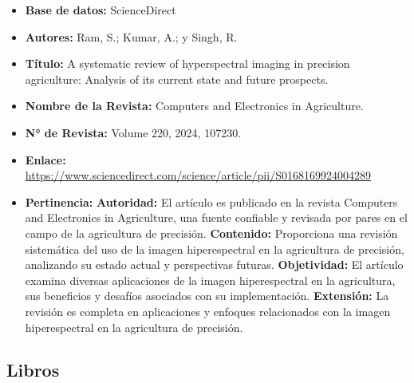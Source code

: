 \begin{itemize}
  \item \textbf{Base de datos:} ScienceDirect
  \item \textbf{Autores:} Ram, S.; Kumar, A.; y Singh, R.
  \item \textbf{Título:} A systematic review of hyperspectral imaging in precision agriculture: Analysis of its current state and future prospects.
  \item \textbf{Nombre de la Revista:} Computers and Electronics in Agriculture.
  \item \textbf{N° de Revista:} Volume 220, 2024, 107230.
  \item \textbf{Enlace:} \url{https://www.sciencedirect.com/science/article/pii/S0168169924004289}
  \item \textbf{Pertinencia:}
  \subitem \textbf{Autoridad:} El artículo es publicado en la revista Computers and Electronics in Agriculture, una fuente confiable y revisada por pares en el campo de la agricultura de precisión.
  \subitem \textbf{Contenido:} Proporciona una revisión sistemática del uso de la imagen hiperespectral en la agricultura de precisión, analizando su estado actual y perspectivas futuras.
  \subitem \textbf{Objetividad:} El artículo examina diversas aplicaciones de la imagen hiperespectral en la agricultura, sus beneficios y desafíos asociados con su implementación.
  \subitem \textbf{Extensión:} La revisión es completa en aplicaciones y enfoques relacionados con la imagen hiperespectral en la agricultura de precisión.
\end{itemize}

\subsection{Libros}

